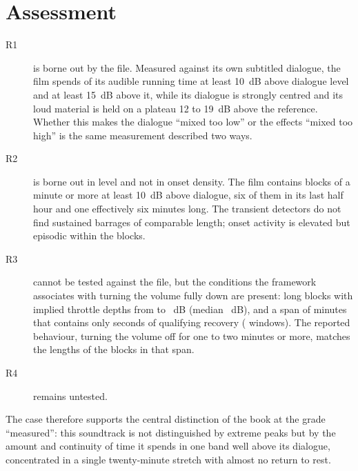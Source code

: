 \section{Assessment}

\begin{description}
\item[R1] is borne out by the file. Measured against its own subtitled dialogue, the film spends \resExceedTen{} of its audible running time at least 10~dB above dialogue level and \resExceedFifteen{} at least 15~dB above it, while its dialogue is strongly centred and its loud material is held on a plateau 12 to 19~dB above the reference. Whether this makes the dialogue ``mixed too low'' or the effects ``mixed too high'' is the same measurement described two ways.
\item[R2] is borne out in level and not in onset density. The film contains \resOccBlocksN{} blocks of a minute or more at least 10~dB above dialogue, six of them in its last half hour and one effectively six minutes long. The transient detectors do not find sustained barrages of comparable length; onset activity is elevated but episodic within the blocks.
\item[R3] cannot be tested against the file, but the conditions the framework associates with turning the volume fully down are present: long blocks with implied throttle depths from \xThrottleMin{} to \resThrottleMax~dB (median \resThrottleMedian~dB), and a span of \xSpanMin{} minutes that contains only \xSpanRecoverySeconds{} seconds of qualifying recovery (\xSpanRecoveryWindows{} windows). The reported behaviour, turning the volume off for one to two minutes or more, matches the lengths of the blocks in that span.
\item[R4] remains untested.
\end{description}

The case therefore supports the central distinction of the book at the grade ``measured'': this soundtrack is not distinguished by extreme peaks but by the amount and continuity of time it spends in one band well above its dialogue, concentrated in a single twenty-minute stretch with almost no return to rest.
